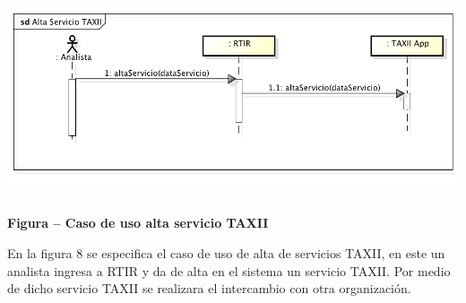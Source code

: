 \bigskip

\begin{center}
	\includegraphics[width=5.7638in,height=2.3217in]{Analisis22-img/Analisis22-img023.png} 
	{\centering{}\bfseries
		\foreignlanguage{spanish}{Figura }\foreignlanguage{spanish}{ -- Caso de uso alta
			servicio TAXII}
		\par}
\end{center}
{
	En la figura 8 se especifica el caso de uso de alta de servicios TAXII, en este un analista ingresa a RTIR y da de alta
	en el sistema un servicio TAXII. Por medio de dicho servicio TAXII se realizara el intercambio con otra organización.}


